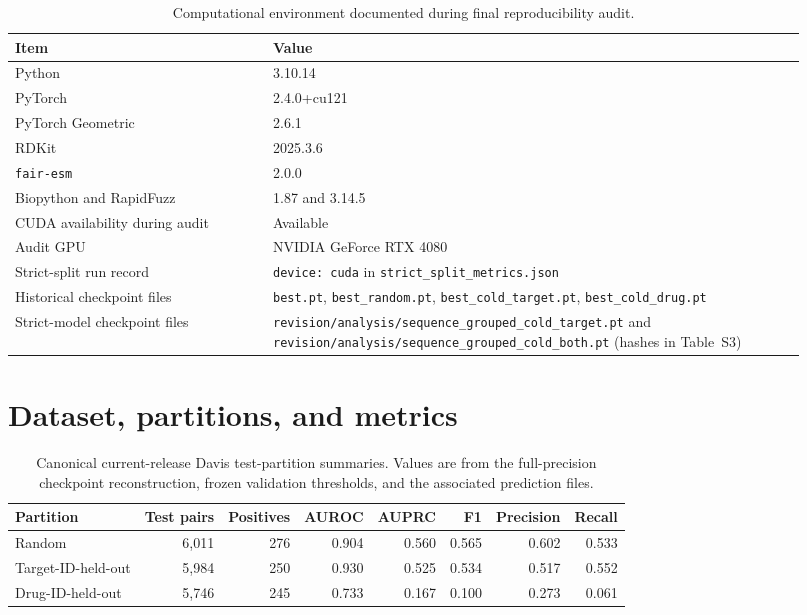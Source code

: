 \documentclass[11pt]{article}
\begin{document}
\begin{table}[H]
\centering
\caption{Computational environment documented during final reproducibility audit.}
\begin{tabular}{p{0.30\linewidth}p{0.62\linewidth}}
\toprule
Item & Value \\
\midrule
Python & 3.10.14 \\
PyTorch & 2.4.0+cu121 \\
PyTorch Geometric & 2.6.1 \\
RDKit & 2025.3.6 \\
\texttt{fair-esm} & 2.0.0 \\
Biopython and RapidFuzz & 1.87 and 3.14.5 \\
CUDA availability during audit & Available \\
Audit GPU & NVIDIA GeForce RTX 4080 \\
Strict-split run record & \texttt{device: cuda} in \texttt{strict\_split\_metrics.json} \\
Historical checkpoint files & \texttt{best.pt}, \texttt{best\_random.pt}, \texttt{best\_cold\_target.pt}, \texttt{best\_cold\_drug.pt} \\
Strict-model checkpoint files & \texttt{revision/analysis/sequence\_grouped\_cold\_target.pt} and \texttt{revision/analysis/sequence\_grouped\_cold\_both.pt} (hashes in Table~S3) \\
\bottomrule
\end{tabular}
\end{table}

\clearpage

\section*{Dataset, partitions, and metrics}

\begin{table}[H]
\centering
\caption{Canonical current-release Davis test-partition summaries. Values are
from the full-precision checkpoint reconstruction, frozen validation thresholds,
and the associated prediction files.}
\begin{tabular}{lrrrrrrr}
\toprule
Partition & Test pairs & Positives & AUROC & AUPRC & F1 & Precision & Recall \\
\midrule
Random & 6,011 & 276 & 0.904 & 0.560 & 0.565 & 0.602 & 0.533 \\
Target-ID-held-out & 5,984 & 250 & 0.930 & 0.525 & 0.534 & 0.517 & 0.552 \\
Drug-ID-held-out & 5,746 & 245 & 0.733 & 0.167 & 0.100 & 0.273 & 0.061 \\
\bottomrule
\end{tabular}
\end{table}
\end{document}
